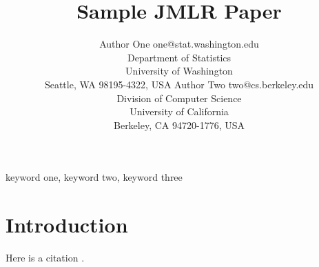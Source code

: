 \documentclass[twoside,11pt]{article}
\begin{document}
\title{Sample JMLR Paper}

\author{\name Author One \email one@stat.washington.edu \\
       \addr Department of Statistics\\
       University of Washington\\
       Seattle, WA 98195-4322, USA
       \AND
       \name Author Two \email two@cs.berkeley.edu \\
       \addr Division of Computer Science\\
       University of California\\
       Berkeley, CA 94720-1776, USA}


\maketitle

\begin{abstract}%
\blindtext
\end{abstract}

\begin{keywords}
  keyword one, keyword two, keyword three
\end{keywords}

\section{Introduction}

\blindmathpaper

Here is a citation \cite{chow:68}.




\newpage

\appendix
\section{}
\label{app:theorem}
\end{document}
